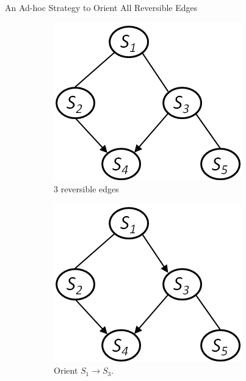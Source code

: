 \documentclass[hyperref={pdfpagelabels=false}]{beamer}
\begin{document}
\begin{frame}{An Ad-hoc Strategy to Orient All Reversible Edges}
	\begin{figure}[!ht]\small
		\centering
		\begin{subfigure}[t]{0.24\linewidth}
			\centering
			\includegraphics[width=0.95\linewidth]{figures/orient-edges-1.png}
			\caption{\scriptsize 3 reversible edges}
		\end{subfigure}
		\begin{subfigure}[t]{0.24\linewidth}
			\centering
			\includegraphics[width=0.95\linewidth]{figures/orient-edges-2.png}
			\caption{\scriptsize Orient $S_1\rightarrow S_3$.}
		\end{subfigure}
		\begin{subfigure}[t]{0.24\linewidth}

\end{subfigure}
\end{figure}
\end{frame}
\end{document}
